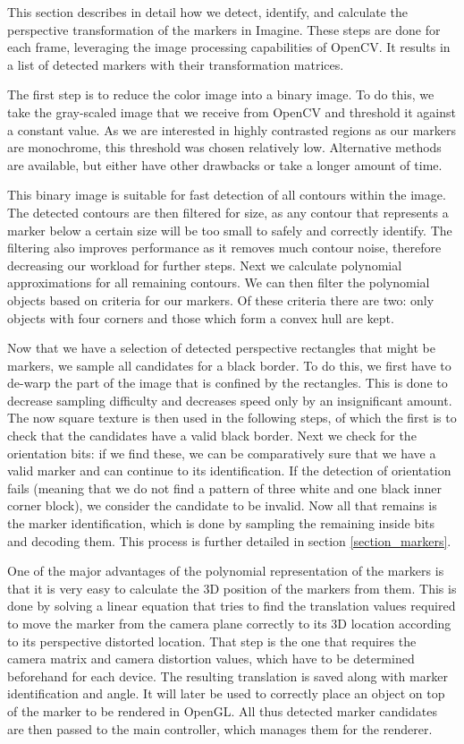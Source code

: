 This section describes in detail how we detect, identify, and calculate the perspective transformation of the markers in Imagine.
These steps are done for each frame, leveraging the image processing capabilities of OpenCV.
It results in a list of detected markers with their transformation matrices.

The first step is to reduce the color image into a binary image.
To do this, we take the gray-scaled image that we receive from OpenCV and threshold it against a constant value.
As we are interested in highly contrasted regions as our markers are monochrome, this threshold was chosen relatively low.
Alternative methods are available, but either have other drawbacks or take a longer amount of time.

This binary image is suitable for fast detection of all contours within the image.
The detected contours are then filtered for size, as any contour that represents a marker below a certain size will be too small to safely and correctly identify.
The filtering also improves performance as it removes much contour noise, therefore decreasing our workload for further steps.
Next we calculate polynomial approximations for all remaining contours.
We can then filter the polynomial objects based on criteria for our markers.
Of these criteria there are two: only objects with four corners and those which form a convex hull are kept.

Now that we have a selection of detected perspective rectangles that might be markers, we sample all candidates for a black border.
To do this, we first have to de-warp the part of the image that is confined by the rectangles.
This is done to decrease sampling difficulty and decreases speed only by an insignificant amount.
The now square texture is then used in the following steps, of which the first is to check that the candidates have a valid black border.
Next we check for the orientation bits: if we find these, we can be comparatively sure that we have a valid marker and can continue to its identification.
If the detection of orientation fails (meaning that we do not find a pattern of three white and one black inner corner block), we consider the candidate to be invalid.
Now all that remains is the marker identification, which is done by sampling the remaining inside bits and decoding them.
This process is further detailed in section \ref{section_markers}.

One of the major advantages of the polynomial representation of the markers is that it is very easy to calculate the 3D position of the markers from them.
This is done by solving a linear equation that tries to find the translation values required to move the marker from the camera plane correctly to its 3D location according to its perspective distorted location.
That step is the one that requires the camera matrix and camera distortion values, which have to be determined beforehand for each device.
The resulting translation is saved along with marker identification and angle.
It will later be used to correctly place an object on top of the marker to be rendered in OpenGL.
All thus detected marker candidates are then passed to the main controller, which manages them for the renderer.

